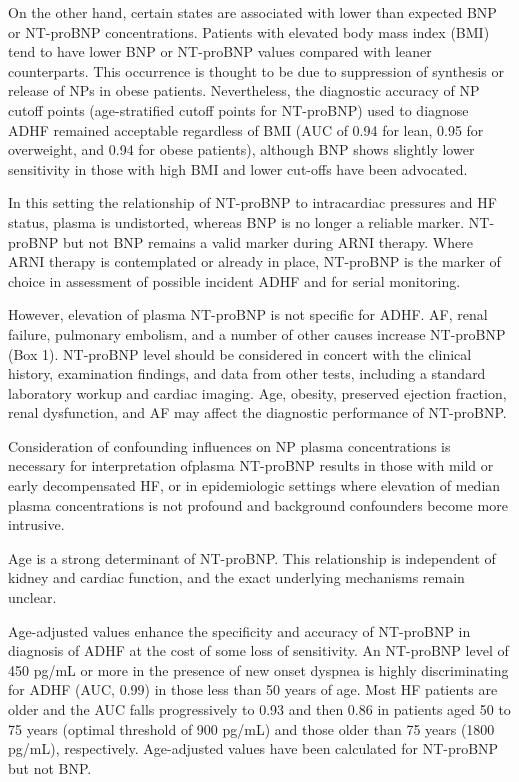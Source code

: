\documentclass[14pt,a4paper,onecolumn]{extarticle}
\begin{document}
On the other hand, certain states are associated with lower than expected BNP or NT-proBNP concentrations. Patients with elevated body mass index (BMI) tend to have lower BNP or NT-proBNP values compared with leaner counterparts. This occurrence is thought to be due to suppression of synthesis or release of NPs in obese patients. Nevertheless, the diagnostic accuracy of NP cutoff points (age-stratified cutoff points for NT-proBNP) used to diagnose ADHF remained acceptable regardless of BMI (AUC of 0.94 for lean, 0.95 for overweight, and 0.94 for obese patients), although BNP shows slightly lower sensitivity in those with high BMI and lower cut-offs have been advocated. \citep{Bayes-Genis2007}

In this setting the relationship of NT-proBNP to intracardiac pressures and HF status, plasma is undistorted, whereas BNP is no longer a reliable marker. NT-proBNP but not BNP remains a valid marker during ARNI therapy. Where ARNI therapy is contemplated or already in place, NT-proBNP is the marker of choice in assessment of possible incident ADHF and for serial monitoring. \citep{Richards2018}

However, elevation of plasma NT-proBNP is not specific for ADHF. AF, renal failure, pulmonary embolism, and a number of other causes increase NT-proBNP (Box 1). NT-proBNP level should be considered in concert with the clinical history, examination findings, and data from other tests, including a standard laboratory workup and cardiac imaging. Age, obesity, preserved ejection fraction, renal dysfunction, and AF may affect the diagnostic performance of NT-proBNP. \citep{Richards2018}

Consideration of confounding influences on NP plasma concentrations is necessary for interpretation ofplasma NT-proBNP results in those with mild or early decompensated HF, or in epidemiologic settings where elevation of median plasma concentrations is not profound and background confounders become more intrusive. \citep{Richards2018}

Age is a strong determinant of NT-proBNP. This relationship is independent of kidney and cardiac function, and the exact underlying mechanisms remain unclear.  \citep{Richards2018}

Age-adjusted values enhance the specificity and accuracy of NT-proBNP in diagnosis of ADHF at the cost of some loss of sensitivity. An NT-proBNP level of 450 pg/mL or more in the presence of new onset dyspnea is highly discriminating for ADHF (AUC, 0.99) in those less than 50 years of age. Most HF patients are older and the AUC falls progressively to 0.93 and then 0.86 in patients aged 50 to 75 years (optimal threshold of 900 pg/mL) and those older than 75 years (1800 pg/mL), respectively. Age-adjusted values have been calculated for NT-proBNP but not BNP. \citep{Januzzi2006a}
\end{document}
